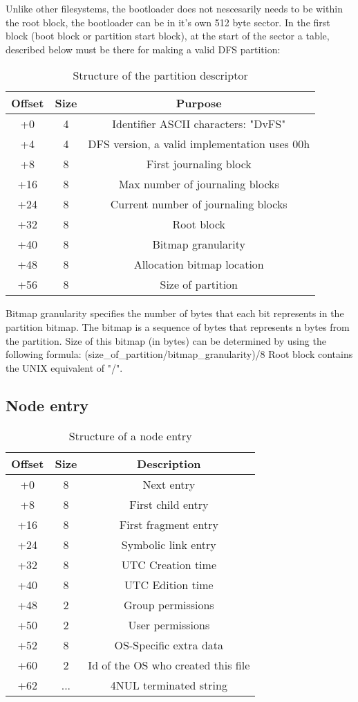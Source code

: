 \documentclass[12pt]{article}
\begin{document}
Unlike other filesystems, the bootloader does not nescesarily needs to be within the root block, the bootloader can be in it's own 512 byte sector.
In the first block (boot block or partition start block), at the start of the sector a table, described below must be there for making a valid DFS partition:

\begin{table}
\centering
\begin{tabular}{ |c|c|c| }
\hline
Offset & Size & Purpose \\
\hline
+0 & 4 & Identifier ASCII characters: "DvFS" \\
+4 & 4 & DFS version, a valid implementation uses 00h \\
+8 & 8 & First journaling block \\
+16 & 8 & Max number of journaling blocks \\
+24 & 8 & Current number of journaling blocks \\
+32 & 8 & Root block \\
+40 & 8 & Bitmap granularity \\
+48 & 8 & Allocation bitmap location \\
+56 & 8 & Size of partition \\
\hline
\end{tabular}
\caption{Structure of the partition descriptor}
\end{table}

Bitmap granularity specifies the number of bytes that each bit represents in the partition bitmap. The bitmap is a sequence of bytes that represents n bytes from the partition. Size of this bitmap (in bytes) can be determined by using the following formula: (size\_of\_partition/bitmap\_granularity)/8
Root block contains the UNIX equivalent of "/".

\subsection{Node entry}

\begin{table}
\centering
\begin{tabular}{ |c|c|c| }
\hline
Offset & Size & Description \\
\hline
+0 & 8 & Next entry \\
+8 & 8 & First child entry \\
+16 & 8 & First fragment entry \\
+24 & 8 & Symbolic link entry \\
+32 & 8 & UTC Creation time \\
+40 & 8 & UTC Edition time \\
+48 & 2 & Group permissions \\
+50 & 2 & User permissions \\
+52 & 8 & OS-Specific extra data \\
+60 & 2 & Id of the OS who created this file \\
+62 & ... & 4NUL terminated string \\
\hline
\end{tabular}
\caption{Structure of a node entry}
\end{table}
\end{document}
